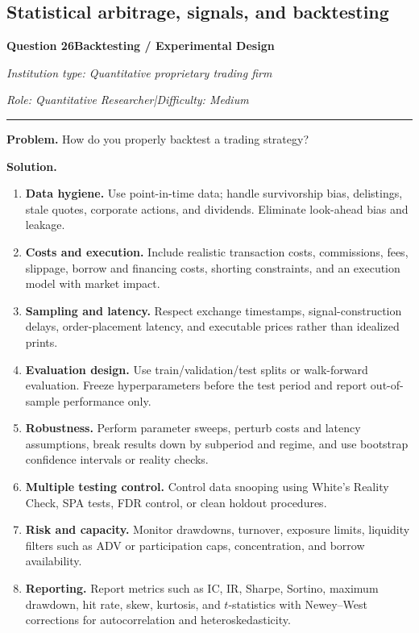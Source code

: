 \documentclass[11pt,letterpaper,openany]{book}
\newcommand{\InterviewQuestionHeader}[5]{%
  \vspace{1.0em}%
  {\large\bfseries #1\enspace #4\par}%
  {\small\itshape Institution type: #2\par}%
  {\small\itshape Role: #3\enspace |\enspace Difficulty: #5\par}%
  \vspace{0.25em}\hrule\vspace{0.45em}%
}
\begin{document}
\subsection{Statistical arbitrage, signals, and backtesting}

\InterviewQuestionHeader{Question 26}{Quantitative proprietary trading firm}{Quantitative Researcher}{Backtesting / Experimental Design}{Medium}
\textbf{Problem.} How do you properly backtest a trading strategy?

\textbf{Solution.}

\begin{enumerate}
\item \textbf{Data hygiene.} Use point-in-time data; handle survivorship bias, delistings, stale quotes, corporate actions, and dividends. Eliminate look-ahead bias and leakage.

\item \textbf{Costs and execution.} Include realistic transaction costs, commissions, fees, slippage, borrow and financing costs, shorting constraints, and an execution model with market impact.

\item \textbf{Sampling and latency.} Respect exchange timestamps, signal-construction delays, order-placement latency, and executable prices rather than idealized prints.

\item \textbf{Evaluation design.} Use train/validation/test splits or walk-forward evaluation. Freeze hyperparameters before the test period and report out-of-sample performance only.

\item \textbf{Robustness.} Perform parameter sweeps, perturb costs and latency assumptions, break results down by subperiod and regime, and use bootstrap confidence intervals or reality checks.

\item \textbf{Multiple testing control.} Control data snooping using White's Reality Check, SPA tests, FDR control, or clean holdout procedures.

\item \textbf{Risk and capacity.} Monitor drawdowns, turnover, exposure limits, liquidity filters such as ADV or participation caps, concentration, and borrow availability.

\item \textbf{Reporting.} Report metrics such as IC, IR, Sharpe, Sortino, maximum drawdown, hit rate, skew, kurtosis, and \(t\)-statistics with Newey--West corrections for autocorrelation and heteroskedasticity.
\end{enumerate}
\end{document}
